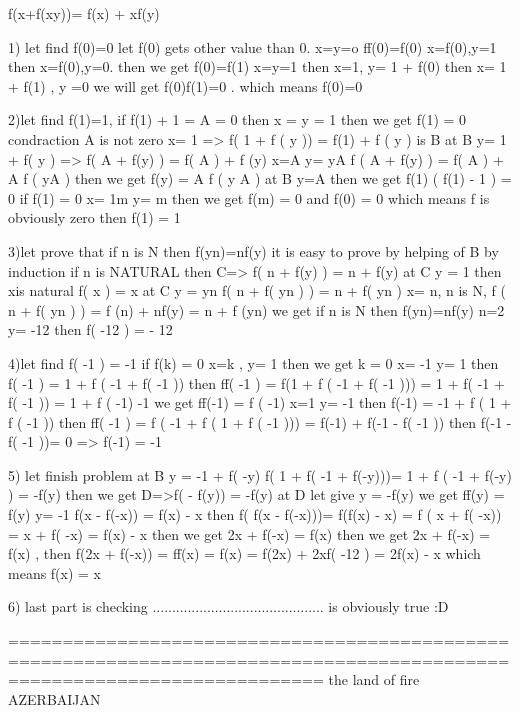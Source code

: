 \begin{solution}
	f(x+f(xy))= f(x) + xf(y) 

1) let find f(0)=0
let f(0) gets other value than 0. x=y=o  ff(0)=f(0)
x=f(0),y=1 then x=f(0),y=0.  then we get f(0)=f(1)
x=y=1 then x=1, y= 1 + f(0) then x= 1 + f(1) , y =0    we will get f(0)f(1)=0 . which means f(0)=0

2)let find f(1)=1, 
if f(1) + 1 = A = 0  then  x = y = 1 then we get f(1) = 0 condraction A is not zero
x= 1 => f( 1 + f ( y )) = f(1) + f ( y ) is B
at B y= 1 + f( y ) => f( A + f(y) ) = f( A ) + f (y)
x=A y= y\/A  f ( A + f(y) ) = f( A ) + A f ( y\/A )
then we get f(y) = A f ( y \/ A )
at B y=A  then we get f(1) ( f(1) - 1 ) = 0 
if f(1) = 0 x= 1\/m y= m then we get  f(m) = 0 and f(0) = 0 which means f is obviously zero
then f(1) = 1 

3)let prove that if n is N then f(yn)=nf(y)
it is easy to prove by helping of B by induction if n is NATURAL then  C=> f( n + f(y) ) = n + f(y)  
at C y = 1 then xis natural f( x ) = x
at C y = yn f( n + f( yn ) ) = n + f( yn ) 
x= n, n is N, f ( n + f( yn ) ) = f (n) + nf(y) = n + f (yn)  we get if n is N then f(yn)=nf(y)
n=2 y= -1\/2 then f( -1\/2 ) = - 1\/2

4)let find f( -1 ) = -1
if f(k) = 0 x=k , y= 1 then we get k = 0
x= -1 y= 1 then f( -1 ) = 1 + f ( -1 + f( -1 )) then ff( -1 ) = f(1 + f ( -1 + f( -1 ))) = 1 + f( -1 + f( -1 )) = 1 + f ( -1) -1 we get ff(-1) = f ( -1)
x=1 y= -1 then f(-1) = -1 + f ( 1 + f ( -1 )) then ff( -1 ) = f ( -1 + f ( 1 + f ( -1 ))) =  f(-1) + f(-1 - f( -1 )) then f(-1 - f( -1 ))= 0 => f(-1) = -1

5) let finish problem
at B y = -1 + f( -y)    f( 1 + f( -1 + f(-y)))= 1 + f ( -1 + f(-y) ) = -f(y) then we get D=>f( - f(y)) = -f(y)
at D let give y = -f(y) we get ff(y) = f(y)
y= -1    f(x - f(-x)) = f(x) - x then   f( f(x - f(-x)))= f(f(x) - x) = f ( x + f( -x)) = x + f( -x) = f(x) - x then we get 2x + f(-x) = f(x)
then we get 2x + f(-x) = f(x) , then f(2x + f(-x)) = ff(x) = f(x) = f(2x) + 2xf( -1\/2 ) = 2f(x) - x  which means f(x) = x

6) last part is checking
............................................ is obviously true :D 


=========================================================================================================================
the land of fire AZERBAIJAN
\end{solution}



